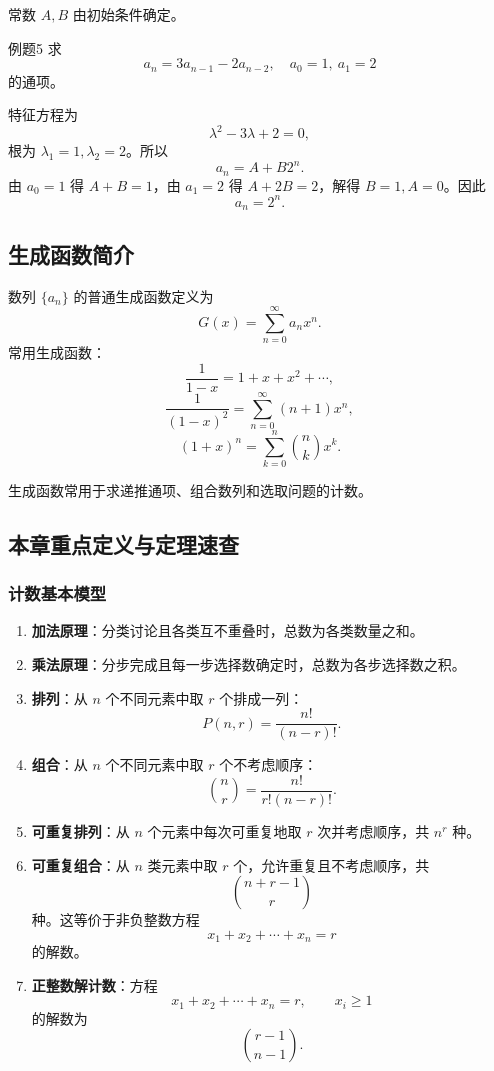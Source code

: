 常数 \(A,B\) 由初始条件确定。

\begin{question}{例题5}
	求
	\[
	a_n=3a_{n-1}-2a_{n-2},\quad a_0=1,\ a_1=2
	\]
	的通项。
	
	\begin{solution}
	特征方程为
	\[
	\lambda^2-3\lambda+2=0,
	\]
	根为 \(\lambda_1=1,\lambda_2=2\)。所以
	\[
	a_n=A+B2^n.
	\]
	由 \(a_0=1\) 得 \(A+B=1\)，由 \(a_1=2\) 得 \(A+2B=2\)，解得 \(B=1,A=0\)。因此
	\[
	a_n=2^n.
	\]
	\end{solution}
\end{question}

\subsection{生成函数简介}

数列 \(\{a_n\}\) 的普通生成函数定义为
\[
G(x)=\sum_{n=0}^{\infty}a_nx^n.
\]
常用生成函数：
\[
\frac{1}{1-x}=1+x+x^2+\cdots,
\]
\[
\frac{1}{(1-x)^2}=\sum_{n=0}^{\infty}(n+1)x^n,
\]
\[
(1+x)^n=\sum_{k=0}^{n}\binom nkx^k.
\]

生成函数常用于求递推通项、组合数列和选取问题的计数。

\subsection{本章重点定义与定理速查}

\subsubsection{计数基本模型}

\begin{enumerate}
	\item \textbf{加法原理}：分类讨论且各类互不重叠时，总数为各类数量之和。
	\item \textbf{乘法原理}：分步完成且每一步选择数确定时，总数为各步选择数之积。
	\item \textbf{排列}：从 \(n\) 个不同元素中取 \(r\) 个排成一列：
	\[
	P(n,r)=\frac{n!}{(n-r)!}.
	\]
	\item \textbf{组合}：从 \(n\) 个不同元素中取 \(r\) 个不考虑顺序：
	\[
	\binom nr=\frac{n!}{r!(n-r)!}.
	\]
	\item \textbf{可重复排列}：从 \(n\) 个元素中每次可重复地取 \(r\) 次并考虑顺序，共 \(n^r\) 种。
	\item \textbf{可重复组合}：从 \(n\) 类元素中取 \(r\) 个，允许重复且不考虑顺序，共
	\[
	\binom{n+r-1}{r}
	\]
	种。这等价于非负整数方程
	\[
	x_1+x_2+\cdots+x_n=r
	\]
	的解数。
	\item \textbf{正整数解计数}：方程
	\[
	x_1+x_2+\cdots+x_n=r,\qquad x_i\ge1
	\]
	的解数为
	\[
	\binom{r-1}{n-1}.
	\]
\end{enumerate}

